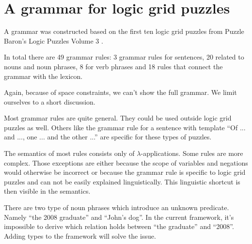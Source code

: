 \section{A grammar for logic grid puzzles}
A grammar was constructed based on the first ten logic grid puzzles from Puzzle Baron's Logic Puzzles Volume 3 \cite{logigrammen}.

In total there are 49 grammar rules: 3 grammar rules for sentences, 20 related to nouns and noun phrases, 8 for verb phrases and 18 rules that connect the grammar with the lexicon.

Again, because of space constraints, we can't show the full grammar. We limit ourselves to a short discussion.

Most grammar rules are quite general. They could be used outside logic grid puzzles as well. Others like the grammar rule for a sentence with template ``Of ... and ..., one ... and the other ...'' are specific for these types of puzzles.

The semantics of most rules consists only of $\lambda$-applications. Some rules are more complex. Those exceptions are either because the scope of variables and negations would otherwise be incorrect or because the grammar rule is specific to logic grid puzzles and can not be easily explained linguistically. This linguistic shortcut is then visible in the semantics.

There are two type of noun phrases which introduce an unknown predicate. Namely ``the 2008 graduate'' and ``John's dog''. In the current framework, it's impossible to derive which relation holds between ``the graduate'' and ``2008''. Adding types to the framework will solve the issue.

